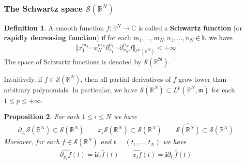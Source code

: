 \documentclass[12pt,b5paper,notitlepage]{article}
\theoremstyle{definition}
\newtheorem{df}{Definition}[subsection]
\theoremstyle{plain}
\newtheorem{pp}[df]{Proposition}
\newcommand{\wht}{\widehat}
\newcommand{\wch}{\widecheck}
\newcommand{\im}{\mathbf{i}}
\newcommand{\Cbb}{\mathbb C}
\newcommand{\Nbb}{\mathbb N}
\newcommand{\Rbb}{\mathbb R}
\newcommand{\mk}{\mathfrak m}
\newcommand{\MF}{\mathcal F}
\newcommand{\MS}{\mathcal S}
\numberwithin{equation}{section}
\begin{document}



\subsubsection{The Schwartz space $\MS(\Rbb^N)$}



\begin{df}\label{lb543}
A smooth function $f:\Rbb^N\rightarrow\Cbb$ is called a \textbf{Schwartz function}  (or \textbf{rapidly decreasing function})  if for each $m_1,\dots,m_N,n_1,\dots,n_N\in\Nbb$ we have
\begin{align*}
\big\Vert x_1^{m_1}\cdots x_N^{m_N}\partial_{x_1}^{n_1}\cdots \partial_{x_N}^{n_N}f\big\Vert_{l^\infty(\Rbb^N)}<+\infty
\end{align*}
The space of Schwartz functions is denoted by $\pmb{\MS(\Rbb^N)}$. \index{SR@$\MS(\Rbb^N)$}
\end{df}

Intuitively, if $f\in\MS(\Rbb^N)$, then all partial derivatives of $f$ grow lower than arbitrary polynomials. In particular, we have $\MS(\Rbb^N)\subset L^p(\Rbb^N,\mk)$ for each $1\leq p\leq+\infty$.

\begin{pp}\label{lb546}
For each $1\leq i\leq N$ we have
\begin{align*}
\partial_{x_i}\MS(\Rbb^N)\subset\MS(\Rbb^N)\qquad x_i\MS(\Rbb^N)\subset\MS(\Rbb^N)\qquad \wht{\MS(\Rbb^N)}\subset\MS(\Rbb^N)
\end{align*}
Moreover, for each $f\in\MS(\Rbb^N)$ and $t=(t_1,\dots,t_N)$ we have
\begin{align}\label{eq255}
\wht{\partial_{x_i}f}(t)=\im t_i \wht f(t)\qquad \wht{x_if}(t)=\im\partial_{t_i}\wht f(t)
\end{align}
\end{pp}
\end{document}
